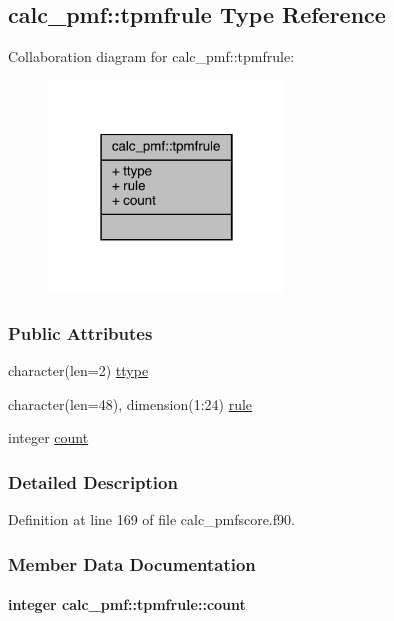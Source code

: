 \hypertarget{structcalc__pmf_1_1tpmfrule}{\subsection{calc\-\_\-pmf\-:\-:tpmfrule Type Reference}
\label{structcalc__pmf_1_1tpmfrule}
}


Collaboration diagram for calc\-\_\-pmf\-:\-:tpmfrule\-:
\nopagebreak
\begin{figure}[H]
\begin{center}
\leavevmode
\includegraphics[width=178pt]{structcalc__pmf_1_1tpmfrule__coll__graph}
\end{center}
\end{figure}
\subsubsection*{Public Attributes}
\begin{DoxyCompactItemize}
\item 
character(len=2) \hyperlink{structcalc__pmf_1_1tpmfrule_a9c140db31e9b6eb044ac210895bb6e67}{ttype}
\item 
character(len=48), dimension(1\-:24) \hyperlink{structcalc__pmf_1_1tpmfrule_a98c2d224034c7aac9c447e70f5d6d3ac}{rule}
\item 
integer \hyperlink{structcalc__pmf_1_1tpmfrule_a42bbdb3aaabe8b82f4ced87464eaa338}{count}
\end{DoxyCompactItemize}


\subsubsection{Detailed Description}


Definition at line 169 of file calc\-\_\-pmfscore.\-f90.



\subsubsection{Member Data Documentation}
\hypertarget{structcalc__pmf_1_1tpmfrule_a42bbdb3aaabe8b82f4ced87464eaa338}{
\paragraph[{count}]{\setlength{\rightskip}{0pt plus 5cm}integer calc\-\_\-pmf\-::tpmfrule\-::count}}\label{structcalc__pmf_1_1tpmfrule_a42bbdb3aaabe8b82f4ced87464eaa338}


